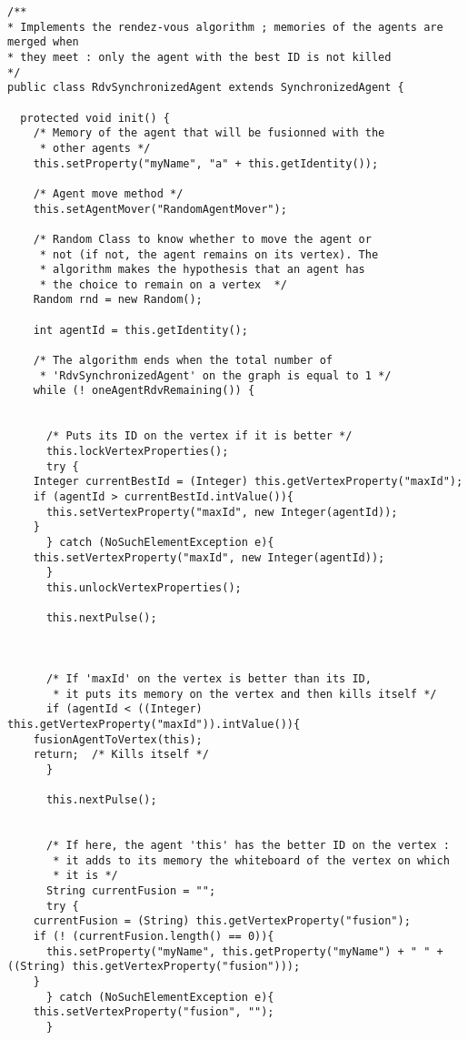 \begin{verbatim}
/**
* Implements the rendez-vous algorithm ; memories of the agents are merged when
* they meet : only the agent with the best ID is not killed
*/
public class RdvSynchronizedAgent extends SynchronizedAgent {

  protected void init() {
    /* Memory of the agent that will be fusionned with the
     * other agents */ 
    this.setProperty("myName", "a" + this.getIdentity());
    
    /* Agent move method */
    this.setAgentMover("RandomAgentMover");
    
    /* Random Class to know whether to move the agent or
     * not (if not, the agent remains on its vertex). The
     * algorithm makes the hypothesis that an agent has
     * the choice to remain on a vertex  */
    Random rnd = new Random();
    
    int agentId = this.getIdentity();
    
    /* The algorithm ends when the total number of
     * 'RdvSynchronizedAgent' on the graph is equal to 1 */  
    while (! oneAgentRdvRemaining()) {
      
      
      /* Puts its ID on the vertex if it is better */
      this.lockVertexProperties();
      try {
	Integer currentBestId = (Integer) this.getVertexProperty("maxId");
	if (agentId > currentBestId.intValue()){
	  this.setVertexProperty("maxId", new Integer(agentId));
	}
      } catch (NoSuchElementException e){
	this.setVertexProperty("maxId", new Integer(agentId));
      }
      this.unlockVertexProperties();
      
      this.nextPulse();
      
      

      /* If 'maxId' on the vertex is better than its ID,
       * it puts its memory on the vertex and then kills itself */
      if (agentId < ((Integer) this.getVertexProperty("maxId")).intValue()){
	fusionAgentToVertex(this);
	return;  /* Kills itself */
      }
      
      this.nextPulse();


      /* If here, the agent 'this' has the better ID on the vertex :
       * it adds to its memory the whiteboard of the vertex on which
       * it is */ 
      String currentFusion = "";
      try {
	currentFusion = (String) this.getVertexProperty("fusion");
	if (! (currentFusion.length() == 0)){
	  this.setProperty("myName", this.getProperty("myName") + " " + ((String) this.getVertexProperty("fusion")));
	}
      } catch (NoSuchElementException e){
	this.setVertexProperty("fusion", "");
      }



\end{verbatim}
